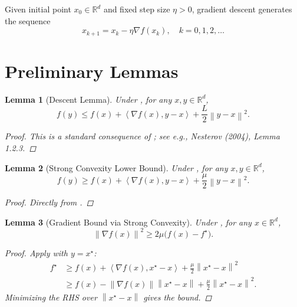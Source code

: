 \documentclass{article}
\newtheorem{lemma}{Lemma}
\newcommand{\R}{\mathbb{R}}
\newcommand{\norm}[1]{\left\|#1\right\|}
\newcommand{\inner}[2]{\left\langle #1, #2 \right\rangle}
\newcommand{\stepsize}{\eta}
\newcommand{\lipschitz}{L}
\newcommand{\strongconvex}{\mu}
\newcommand{\opt}{x^\star}
\newcommand{\grad}{\nabla}
\begin{document}
Given initial point $x_0 \in \R^d$ and fixed step size $\stepsize > 0$, gradient descent generates the sequence
\begin{equation}
    x_{k+1} = x_k - \stepsize \grad f(x_k), \quad k = 0, 1, 2, \dots \tag{GD}
\end{equation}

\section{Preliminary Lemmas}

\begin{lemma}[Descent Lemma] \label{lemma:descent}
    Under , for any $x, y \in \R^d$,
    \begin{equation}
        f(y) \le f(x) + \inner{\grad f(x)}{y - x} + \frac{\lipschitz}{2} \norm{y - x}^2. \tag{Step 1}
    \end{equation}
    \begin{proof}
        This is a standard consequence of ; see e.g., Nesterov (2004), Lemma 1.2.3.
    \end{proof}
\end{lemma}

\begin{lemma}[Strong Convexity Lower Bound] \label{lemma:sc-lower}
    Under , for any $x, y \in \R^d$,
    \begin{equation}
        f(y) \ge f(x) + \inner{\grad f(x)}{y - x} + \frac{\strongconvex}{2} \norm{y - x}^2. \tag{Step 2}
    \end{equation}
    \begin{proof}
        Directly from .
    \end{proof}
\end{lemma}

\begin{lemma}[Gradient Bound via Strong Convexity] \label{lemma:grad-bound}
    Under , for any $x \in \R^d$,
    \begin{equation}
        \norm{\grad f(x)}^2 \ge 2\strongconvex \bigl( f(x) - f^\star \bigr). \tag{Step 3}
    \end{equation}
    \begin{proof}
        Apply  with $y = \opt$:
        \begin{align}
            f^\star &\ge f(x) + \inner{\grad f(x)}{\opt - x} + \frac{\strongconvex}{2} \norm{\opt - x}^2 \\
            &\ge f(x) - \norm{\grad f(x)} \norm{\opt - x} + \frac{\strongconvex}{2} \norm{\opt - x}^2.
        \end{align}
        Minimizing the RHS over $\norm{\opt - x}$ gives the bound.
    \end{proof}
\end{lemma}
\end{document}
